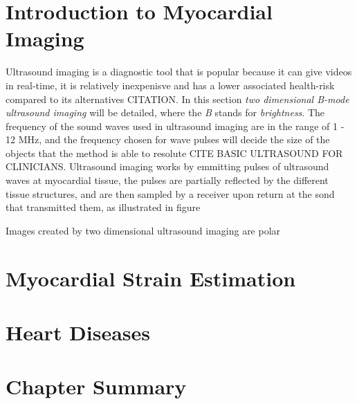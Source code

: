 \section{Introduction to Myocardial Imaging}
\begin{comment}
[ ] Even shorter about ultrasound, the different views, and what parts of the heart can be seen in them.
\end{comment}
Ultrasound imaging is a diagnostic tool that is popular because it can give videos in real-time, it is relatively inexpenisve and has a lower associated health-risk compared to its alternatives CITATION. In this section \textit{two dimensional B-mode ultrasound imaging} will be detailed, where the \textit{B} stands for \textit{brightness}. The frequency of the sound waves used in ultrasound imaging are in the range of 1 - 12 MHz, and the frequency chosen for wave pulses will decide the size of the objects that the method is able to resolute CITE BASIC ULTRASOUND FOR CLINICIANS. Ultrasound imaging works by emmitting pulses of ultrasound waves at myocardial tissue, the pulses are partially reflected by the different tissue structures, and are then sampled by a receiver upon return at the sond that transmitted them, as illustrated in figure %


Images created by two dimensional ultrasound imaging are polar 

\section{Myocardial Strain Estimation}
\begin{comment}
[ ] Method for extracting strain curves from ultrasound videos.
\end{comment}

\section{Heart Diseases}
\begin{comment}
[ ] Explain the different diagnosises that will be encountered in this thesis.
[ ] Explain anatomical reasoning for why symptoms for certain diagnosis are evident in strain curves.
\end{comment}

\section{Chapter Summary}
